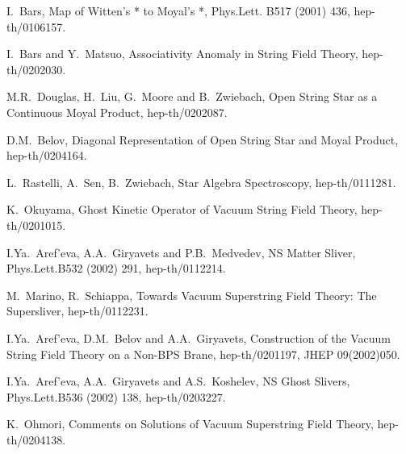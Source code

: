 \documentclass[a4paper,12pt]{article}
\begin{document}
{\begin{thebibliography}{99}
 I.~Bars,
\textsf{Map of Witten's * to Moyal's *}, Phys.Lett. B517 (2001)
436, hep-th/0106157.

 I.~Bars and Y.~Matsuo,
\textsf{Associativity Anomaly in String Field Theory},
hep-th/0202030.




  M.R.~Douglas, H.~Liu, G.~Moore and B.~Zwiebach,
\textsf{Open String Star as a Continuous Moyal Product},
hep-th/0202087.

 D.M.~Belov,
\textsf{Diagonal Representation of Open String Star and Moyal
Product}, hep-th/0204164.


 L.~Rastelli, A.~Sen, B.~Zwiebach,
\textsf{Star Algebra Spectroscopy}, hep-th/0111281.

 K.~Okuyama, \textsf{Ghost Kinetic Operator of Vacuum
String Field Theory}, hep-th/0201015.



 I.Ya.~Aref'eva, A.A.~Giryavets and P.B.~Medvedev,
\textsf{NS Matter Sliver}, Phys.Lett.B532 (2002) 291, hep-th/0112214.

 M.~Marino, R.~Schiappa,
\textsf{Towards Vacuum Superstring Field Theory: The Supersliver},
hep-th/0112231.


 I.Ya.~Aref'eva, D.M.~Belov and A.A.~Giryavets,
\textsf{Construction of the Vacuum String Field Theory on a
Non-BPS Brane}, hep-th/0201197, JHEP 09(2002)050.


 I.Ya.~Aref'eva, A.A.~Giryavets and A.S.~Koshelev,
\textsf{NS Ghost Slivers}, Phys.Lett.B536 (2002) 138, hep-th/0203227.

 K.~Ohmori,
\textsf{Comments on Solutions of Vacuum Superstring Field Theory},
hep-th/0204138.




\end{thebibliography}}
\end{document}
